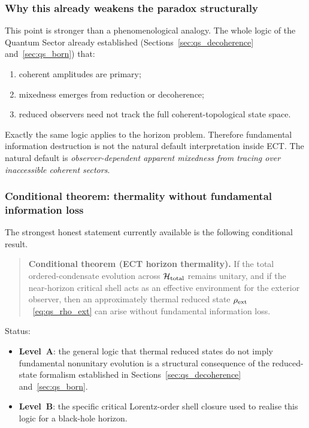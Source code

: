 \subsubsection*{Why this already weakens the paradox structurally}

This point is stronger than a phenomenological analogy.
The whole logic of the Quantum Sector already established
(Sections~\ref{sec:qs_decoherence} and~\ref{sec:qs_born}) that:
\begin{enumerate}[label=(\roman*)]
  \item coherent amplitudes are primary;
  \item mixedness emerges from reduction or decoherence;
  \item reduced observers need not track the full coherent-topological
    state space.
\end{enumerate}
Exactly the same logic applies to the horizon problem.
Therefore fundamental information destruction is not the natural default
interpretation inside ECT.
The natural default is
\emph{observer-dependent apparent mixedness from tracing over
inaccessible coherent sectors}.

\subsubsection*{Conditional theorem: thermality without fundamental information loss}

The strongest honest statement currently available is the following
conditional result.

\begin{quote}
\textbf{Conditional theorem (ECT horizon thermality).}
If the total ordered-condensate evolution across
$\mathcal{H}_{\rm total}$ remains unitary, and if the near-horizon
critical shell acts as an effective environment for the exterior
observer, then an approximately thermal reduced state
$\rho_{\rm ext}$~\eqref{eq:qs_rho_ext} can arise without fundamental
information loss.
\end{quote}

Status:
\begin{itemize}
  \item \textbf{Level~A}: the general logic that thermal reduced states
    do not imply fundamental nonunitary evolution is a structural
    consequence of the reduced-state formalism established in
    Sections~\ref{sec:qs_decoherence} and~\ref{sec:qs_born}.
  \item \textbf{Level~B}: the specific critical Lorentz-order shell
    closure used to realise this logic for a black-hole horizon.
\end{itemize}

